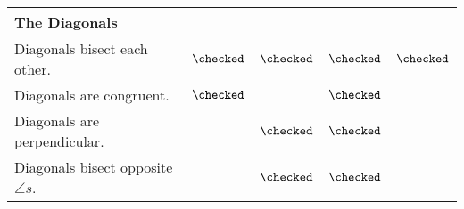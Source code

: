 \begin{center}
{\begin{minipage}{\textwidth}
{\par\vskip1pt

\begin{tabularx}{\textwidth}{|>{\hsize}X|>{\hsize}Y|>{\hsize}Y|>{\hsize}Y|>{\hsize}Y|}
\hline
\textbf{The Diagonals} & & & &\\
\hline
Diagonals bisect each other. & $\checked$ & $\checked$ & $\checked$ & $\checked$\\
\hline
Diagonals are congruent.  & $\checked$ & & $\checked$ &\\
\hline
Diagonals are perpendicular.  & & $\checked$ & $\checked$ &\\
\hline
Diagonals bisect opposite $\angle s$.  & & $\checked$ & $\checked$ &\\
\hline
\end{tabularx} 
}
\end{minipage}}
\end{center}  



